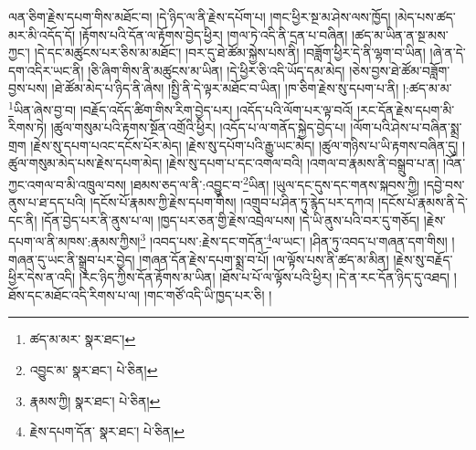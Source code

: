 ལན་ཅིག་རྗེས་དཔག་གིས་མཐོང་བ། །དེ་ཉིད་ལ་ནི་རྗེས་དཔོག་པ། །གང་ཕྱིར་སྔ་མ་ཤེས་ལས་ཁྱོད། །མེད་པས་ཚད་མར་མི་འདོད་དོ། །རྟོགས་པའི་དོན་ལ་རྟོགས་བྱེད་ཕྱིར། །གལ་ཏེ་འདི་ནི་དྲན་པ་བཞིན། །ཚད་མ་ཡིན་ན་སྔ་མས་ཀྱང་། །དེ་དང་མཚུངས་པར་ཅིས་མ་མཐོང་། །བར་དུ་ཐེ་ཚོམ་སྐྱེས་པས་ནི། །བཟློག་ཕྱིར་དེ་ནི་ལྷག་བ་ཡིན། །ཞེ་ན་དེ་དག་འདིར་ཡང་ནི། །ཅི་ཞིག་གིས་ནི་མཚུངས་མ་ཡིན། །དེ་ཕྱིར་ཅི་འདི་ཡོད་དམ་མེད། །ཅེས་བྱས་ཐེ་ཚོམ་བཟློག་བྱས་པས། །ཐེ་ཚོམ་མེད་པ་ཉིད་ནི་ཞེས། །སྤྱི་ནི་དེ་ལྟར་མཐོང་བ་ཡིན། །ཁ་ཅིག་རྗེས་སུ་དཔག་པ་ནི། །:ཚད་མ་མ་\footnote{ཚད་མ་མར་  སྣར་ཐང་། }ཡིན་ཞེས་བྱ་བ། །བརྗོད་འདོད་ཚིག་གིས་རིག་བྱེད་པར། །འདོད་པའི་ལོག་པར་ལྟ་བའོ། །རང་དོན་རྗེས་དཔག་མི་རིགས་ཏེ། །ཚུལ་གསུམ་པའི་རྟགས་སྔོན་འགྲོའི་ཕྱིར། །འདོད་པ་ལ་གནོད་སྐྱེད་བྱེད་པ། །ལོག་པའི་ཤེས་པ་བཞིན་སྨྲ་གྲག །རྗེས་སུ་དཔག་པའང་དངོས་པོར་མེད། །རྗེས་སུ་དཔོག་པའི་རྒྱུ་ཡང་མེད། །ཚུལ་གཉིས་པ་ཡི་རྟགས་བཞིན་དུ། །ཚུལ་གསུམ་མེད་པས་རྗེས་དཔག་མེད། །རྗེས་སུ་དཔག་པ་དང་འགལ་བའི། །འགལ་བ་རྣམས་ནི་བསྒྲུབ་པ་ན། །འོན་ཀྱང་འགལ་བ་མི་འཁྲུལ་བས། །ཐམས་ཅད་ལ་ནི་:འབྱུང་བ་\footnote{འབྱུང་མ་  སྣར་ཐང་།  པེ་ཅིན། }ཡིན། །ཡུལ་དང་དུས་དང་གནས་སྐབས་ཀྱི། །དབྱེ་བས་ནུས་པ་ཐ་དད་པའི། །དངོས་པོ་རྣམས་ཀྱི་རྗེས་དཔག་གིས། །འགྲུབ་པ་ཤིན་ཏུ་རྙེད་པར་དཀའ། །དངོས་པོ་རྣམས་ནི་དེ་དང་ནི། །དོན་བྱེད་པར་ནི་ནུས་པ་ལ། །ཁྱད་པར་ཅན་གྱི་རྗེས་འབྲེལ་པས། །དེ་ཡི་ནུས་པའི་བར་དུ་གཅོད། །རྗེས་དཔག་ལ་ནི་མཁས་:རྣམས་ཀྱིས།\footnote{རྣམས་ཀྱི།  སྣར་ཐང་།  པེ་ཅིན། } །འབད་པས་:རྗེས་དང་གདོན་\footnote{རྗེས་དཔག་དོན་  སྣར་ཐང་།  པེ་ཅིན། }ལ་ཡང་། །ཤིན་ཏུ་འབད་པ་གཞན་དག་གིས། །གཞན་དུ་ཡང་ནི་སྒྲུབ་པར་བྱེད། །གཞན་དོན་རྗེས་དཔག་སྨྲ་བ་པོ། །ལ་ལྟོས་པས་ནི་ཚད་མ་མིན། །རྗེས་སུ་བརྗོད་ཕྱིར་དེས་ན་འདི། །རང་ཉིད་ཀྱིས་དོན་རྟོགས་མ་ཡིན། །ཐོས་པ་པོ་ལ་ལྟོས་པའི་ཕྱིར། །དེ་ན་རང་དོན་ཉིད་དུ་འཐད། །ཐོས་དང་མཐོང་འདི་རིགས་པ་ལ། །གང་གཙོ་འདི་ཡི་ཁྱད་པར་ཅི། །
